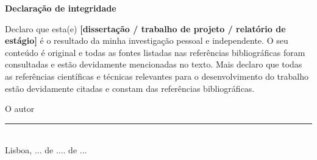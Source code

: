 

\begin{center}
    \textbf{Declaração de integridade}
\end{center}

Declaro que esta(e) \textbf{[dissertação / trabalho de projeto / relatório de estágio]} é o resultado da minha investigação pessoal e independente. O seu conteúdo é original e todas as fontes listadas nas referências bibliográficas foram consultadas e estão devidamente mencionadas no texto. Mais declaro que todas as referências científicas e técnicas relevantes para o desenvolvimento do trabalho estão devidamente citadas e constam das referências bibliográficas.

\begin{center}
O autor
\\[2em]

\rule{.5\textwidth}{1pt}
\\[.5em]
\fontsize{10}{12.2}
\selectfont
Lisboa, ...  de .... de ...
\end{center}

